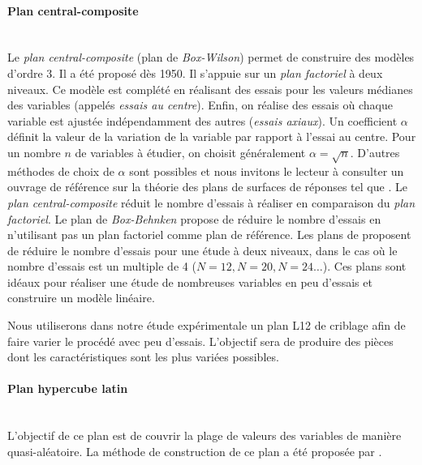 \paragraph{Plan central-composite}\mbox{\label{parag:doe_cc}} \\
Le \textit{plan central-composite} (plan de \textit{Box-Wilson}) permet de construire des modèles d'ordre 3.
Il a été proposé dès 1950.
Il s'appuie sur un \textit{plan factoriel} à deux niveaux.
Ce modèle est complété en réalisant des essais pour les valeurs médianes des variables (appelés \textit{essais au centre}).
Enfin, on réalise des essais où chaque variable est ajustée indépendamment des autres (\textit{essais axiaux}).
Un coefficient $\alpha$ définit la valeur de la variation de la variable par rapport à l'essai au centre.
Pour un nombre $n$ de variables à étudier, on choisit généralement $\alpha = \sqrt{n}$.
D'autres méthodes de choix de $\alpha$ sont possibles et nous invitons le lecteur à consulter un ouvrage de référence sur la théorie des plans de surfaces de réponses tel que  \cite{myers_response_1971}.
Le \textit{plan central-composite} réduit le nombre d'essais à réaliser en comparaison du \textit{plan factoriel}.
Le plan de \textit{Box-Behnken} propose de réduire le nombre d'essais en n'utilisant pas un plan factoriel comme plan de référence.
Les plans de \citeauthor{plackett_design_1946} \cite{plackett_design_1946} proposent de réduire le nombre d'essais pour une étude à deux niveaux, dans le cas où le nombre d'essais est un multiple de 4 ($N=12, N=20, N=24 \dots$).
Ces plans sont idéaux pour réaliser une étude de nombreuses variables en peu d'essais et construire un modèle linéaire.

Nous utiliserons dans notre étude expérimentale un plan L12 de criblage afin de faire varier le procédé avec peu d'essais.
L'objectif sera de produire des pièces dont les caractéristiques sont les plus variées possibles.

\paragraph{Plan hypercube latin}\mbox{\label{parag:doe_lhs}} \\
L'objectif de ce plan est de couvrir la plage de valeurs des variables de manière quasi-aléatoire.
La méthode de construction de ce plan a été proposée par \citeauthor{mckay_comparison_1979} \cite{mckay_comparison_1979}. %

